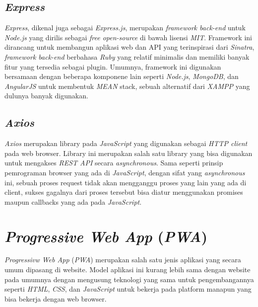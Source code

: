 \subsection{\emph{Express}}
\vspace{1ex}

\emph{Express}, dikenal juga sebagai \emph{Express.js}, merupakan \emph{framework back-end} untuk \emph{Node.js} yang dirilis sebagai \emph{free open-source} di bawah lisensi \emph{MIT}.
Framework ini dirancang untuk membangun aplikasi web dan API yang terinspirasi dari \emph{Sinatra}, \emph{framework back-end} berbahasa \emph{Ruby} yang relatif minimalis dan memiliki banyak fitur yang tersedia sebagai plugin.
Umumnya, framework ini digunakan bersamaan dengan beberapa komponene lain seperti \emph{Node.js}, \emph{MongoDB}, dan \emph{AngularJS} untuk membentuk \emph{MEAN} stack, sebuah alternatif dari \emph{XAMPP} yang dulunya banyak digunakan.
\vspace{0.5ex}

\newpage

\subsection{\emph{Axios}}
\vspace{1ex}

\emph{Axios} merupakan library pada \emph{JavaScript} yang digunakan sebagai \emph{HTTP client} pada web browser.
Library ini merupakan salah satu library yang bisa digunakan untuk mengakses \emph{REST API} secara \emph{asynchronous}.
Sama seperti prinsip pemrograman browser yang ada di \emph{JavaScript}, dengan sifat yang \emph{asynchronous} ini, sebuah proses request tidak akan mengganggu proses yang lain yang ada di client, sukses gagalnya dari proses tersebut bisa diatur menggunakan promises maupun callbacks yang ada pada \emph{JavaScript}.
\vspace{0.5ex}

\section{\emph{Progressive Web App} (\emph{PWA})}
\vspace{1ex}

\emph{Progressivw Web App} (\emph{PWA}) merupakan salah satu jenis aplikasi yang secara umum dipasang di website.
Model aplikasi ini kurang lebih sama dengan website pada umumnya dengan mengusung teknologi yang sama untuk pengembangannya seperti \emph{HTML}, \emph{CSS}, dan \emph{JavaScript} untuk bekerja pada platform manapun yang bisa bekerja dengan web browser.
\vspace{0.5ex}

